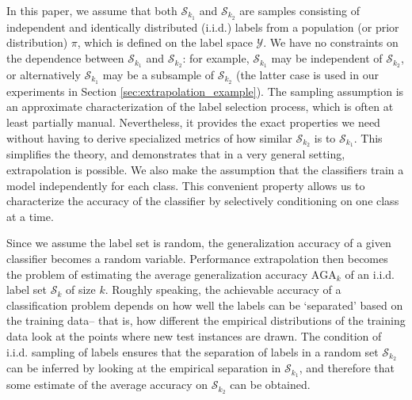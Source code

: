 \documentclass[twoside,11pt]{article}
\begin{document}
In this paper, we assume that both $\mathcal{S}_{k_1}$ and
$\mathcal{S}_{k_2}$ are samples consisting of independent and identically distributed (i.i.d.)
labels from a population (or prior distribution) $ \pi$, which is
defined on the label space $\mathcal{Y}$. We have no constraints on the dependence between $\mathcal{S}_{k_1}$ and
$\mathcal{S}_{k_2}$: for example, $\mathcal{S}_{k_1}$ may be independent of
$\mathcal{S}_{k_2}$, or alternatively $\mathcal{S}_{k_1}$ may be a subsample of $\mathcal{S}_{k_2}$ (the latter case is used in our experiments in Section \ref{sec:extrapolation_example}). %
 The sampling assumption is an approximate characterization of the label selection process, which is often at least partially manual.
Nevertheless, it provides the exact properties we need without having to derive specialized metrics of how similar $\mathcal{S}_{k_2}$ is to $\mathcal{S}_{k_1}$.
This simplifies the theory, and demonstrates that in a very general setting, extrapolation is possible.
We also make the assumption that the classifiers train a
model independently for each class.  This convenient property allows us to characterize the accuracy of the classifier by selectively
conditioning on one class at a time.

Since we assume the label set is random, the generalization accuracy of a given classifier becomes a random variable.  Performance extrapolation then becomes the problem
of estimating the average generalization accuracy $\text{AGA}_k$ of an
i.i.d. label set $\mathcal{S}_k$ of size $k$.
Roughly speaking, the achievable accuracy of a classification problem
depends on how well the labels can be `separated' based on the training data--
that is, how different the empirical distributions of the training data look
at the points where new test instances are drawn.  %
The condition of
i.i.d. sampling of labels ensures that the separation of labels in a
random set $\mathcal{S}_{k_2}$ can be inferred by looking at the
empirical separation in $\mathcal{S}_{k_1}$, and therefore that some
estimate of the average accuracy on $\mathcal{S}_{k_2}$ can be
obtained.

\end{document}
